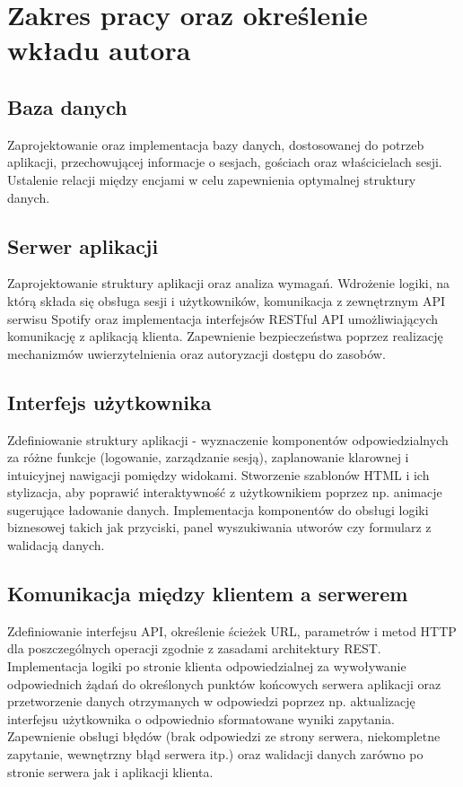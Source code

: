 \section{Zakres pracy oraz określenie wkładu autora}
\subsection{Baza danych}
Zaprojektowanie oraz implementacja bazy danych, dostosowanej do potrzeb aplikacji, przechowującej informacje o sesjach, gościach oraz właścicielach sesji. Ustalenie relacji między encjami w celu zapewnienia optymalnej struktury danych.
\subsection{Serwer aplikacji}
Zaprojektowanie struktury aplikacji oraz analiza wymagań. Wdrożenie logiki, na którą składa się obsługa sesji i użytkowników, komunikacja z zewnętrznym API serwisu Spotify oraz implementacja interfejsów RESTful API umożliwiających komunikację z aplikacją klienta. Zapewnienie bezpieczeństwa poprzez realizację mechanizmów uwierzytelnienia oraz autoryzacji dostępu do zasobów. 
\subsection{Interfejs użytkownika}
Zdefiniowanie struktury aplikacji - wyznaczenie komponentów odpowiedzialnych za różne funkcje (logowanie, zarządzanie sesją), zaplanowanie klarownej i intuicyjnej nawigacji pomiędzy widokami. Stworzenie szablonów HTML i ich stylizacja, aby poprawić interaktywność z użytkownikiem poprzez np. animacje sugerujące ładowanie danych. Implementacja komponentów do obsługi logiki biznesowej takich jak przyciski, panel wyszukiwania utworów czy formularz z walidacją danych.
\subsection{Komunikacja między klientem a serwerem}
Zdefiniowanie interfejsu API, określenie ścieżek URL, parametrów i metod HTTP dla poszczególnych operacji zgodnie z zasadami architektury REST. Implementacja logiki po stronie klienta odpowiedzialnej za wywoływanie odpowiednich żądań do określonych punktów końcowych serwera aplikacji oraz przetworzenie danych otrzymanych w odpowiedzi poprzez np. aktualizację interfejsu użytkownika o odpowiednio sformatowane wyniki zapytania. Zapewnienie obsługi błędów (brak odpowiedzi ze strony serwera, niekompletne zapytanie, wewnętrzny błąd serwera itp.) oraz walidacji danych zarówno po stronie serwera jak i aplikacji klienta. 
